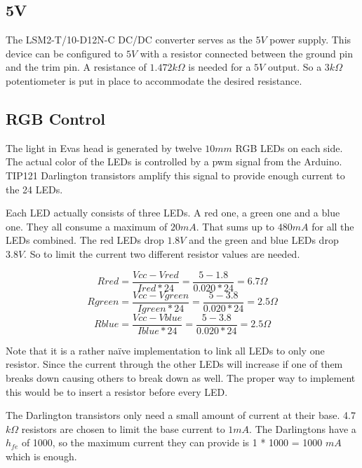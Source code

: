 \documentclass[technical_document.tex]{subfiles}
\begin{document}
\subsection{5V}
The  LSM2-T/10-D12N-C  DC/DC converter serves as the $5V$ power supply. This device can be configured to $5V$ with a resistor connected between the ground pin and the trim pin. A resistance of $1.472 k\Omega$ is needed for a $5V$ output. So a $3k\Omega$ potentiometer is put in place to accommodate the desired resistance.


 \newpage
\subsection{RGB Control}
The light in Eva\textquotesingle s head is generated by twelve $10mm$ RGB LEDs on each side. The actual color of the LEDs is controlled by a pwm signal from the Arduino. TIP121 Darlington transistors amplify this signal to provide enough current to the 24 LEDs.

Each LED actually consists of three LEDs. A red one, a green one and a blue one. They all consume a maximum of $20 mA$. That sums up to $480mA$ for all the LEDs combined. The red LEDs drop $1.8V$ and the green and blue LEDs drop $3.8V$. So to limit the current two different resistor values are needed.

\begin{equation*}
Rred =  \frac{Vcc-Vred}{Ired*24} = \frac{5-1.8}{0.020*24} = 6.7 \Omega
\end{equation*}
\begin{equation*}
Rgreen = \frac{Vcc-Vgreen}{Igreen*24} =\frac{5-3.8}{0.020*24} = 2.5 \Omega
\end{equation*}
\begin{equation*}
Rblue = \frac{Vcc-Vblue}{Iblue*24} =\frac{5-3.8}{0.020*24} = 2.5 \Omega
\end{equation*}

Note that it is a rather na\"{i}ve implementation to link all LEDs to only one resistor. Since the current through the other LEDs will increase if one of them breaks down causing others to break down as well. The proper way to implement this would be to insert a resistor before every LED.

The Darlington transistors only need a small amount of current at their base. 4.7$k\Omega$ resistors are chosen to limit the base current to $1 mA$. The Darlingtons have a $h_{fe}$ of 1000, so the maximum current they can provide is 1 * 1000 = 1000 $mA$ which is enough.
\end{document}
